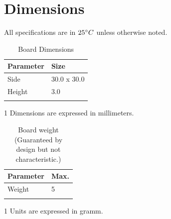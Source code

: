 \documentclass[10pt]{datasheet}
\begin{document}
\section{Dimensions}
All specifications are in $25\degree C$  unless otherwise noted.
\begin{table}[h]
\caption{Board Dimensions}
\begin{tabularx}{\textwidth}{l | X}
    \thickhline
    \textbf{Parameter} & \textbf{Size} \hspace{5cm} \\
    \hline
    Side & 30.0 x 30.0  \\
	Height & 3.0 \\
    \thickhline
\end{tabularx}
	\begin{tablenotes}
	\item[1]{Dimensions are expressed in millimeters.}
	\end{tablenotes}
\end{table}


\begin{table}[h]
\caption{Board weight (Guaranteed by design but not characteristic.)}
\begin{tabularx}{\textwidth}{l | X}
    \thickhline
	\textbf{Parameter} & \textbf{Max.}  \hspace{5cm} \\
    \hline
	Weight & 5 \\
	
    \thickhline
\end{tabularx}
	\begin{tablenotes}
	\item[1]{Units are expressed in gramm.}
	\end{tablenotes}
\end{table}

\newpage
\end{document}
